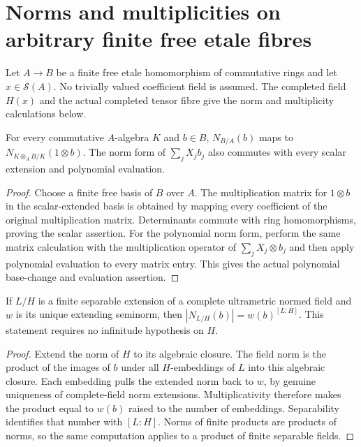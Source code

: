 \section{Norms and multiplicities on arbitrary finite free etale fibres}
\label{sec:general-etale-norms}

Let $A\to B$ be a finite free etale homomorphism of commutative rings
and let $x\in\mathcal S(A)$. No trivially valued coefficient field is
assumed. The completed field $H(x)$ and the actual completed tensor
fibre give the norm and multiplicity calculations below.

\begin{lemma}
\label{spectrum:algebra-norm-base-change}
\leanok
{}
For every commutative $A$-algebra $K$ and $b\in B$,
$N_{B/A}(b)$ maps to $N_{K\otimes_A B/K}(1\otimes b)$.
The norm form of $\sum_j X_jb_j$ also commutes with every scalar
extension and polynomial evaluation.
\end{lemma}
\begin{proof}
Choose a finite free basis of $B$ over $A$. The multiplication matrix
for $1\otimes b$ in the scalar-extended basis is obtained by mapping
every coefficient of the original multiplication matrix. Determinants
commute with ring homomorphisms, proving the scalar assertion.
For the polynomial norm form, perform the same matrix calculation
with the multiplication operator of $\sum_j X_j\otimes b_j$ and
then apply polynomial evaluation to every matrix entry. This gives
the actual polynomial base-change and evaluation assertion.
\end{proof}

\begin{lemma}
\label{spectrum:scalar-field-norm}
\leanok
{}
If $L/H$ is a finite separable extension of a complete ultrametric
normed field and $w$ is its unique extending seminorm, then
$|N_{L/H}(b)|=w(b)^{[L:H]}$. This statement requires no infinitude
hypothesis on $H$.
\end{lemma}
\begin{proof}
Extend the norm of $H$ to its algebraic closure. The field norm is
the product of the images of $b$ under all $H$-embeddings of $L$
into this algebraic closure. Each embedding pulls the extended norm
back to $w$, by genuine uniqueness of complete-field norm extensions.
Multiplicativity therefore makes the product equal to $w(b)$ raised
to the number of embeddings. Separability identifies that number
with $[L:H]$. Norms of finite products are products of norms,
so the same computation applies to a product of finite separable fields.
\end{proof}

